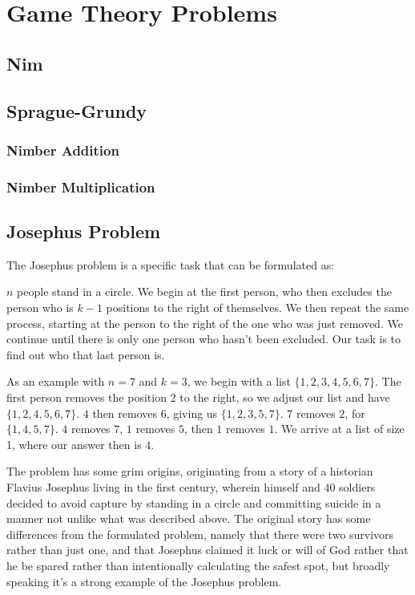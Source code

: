 \section{Game Theory Problems}

\subsection{Nim}

\subsection{Sprague-Grundy}

\subsubsection{Nimber Addition}

\subsubsection{Nimber Multiplication}

\subsection{Josephus Problem}

The Josephus problem is a specific task that can be formulated as:

$n$ people stand in a circle. We begin at the first person, who then excludes the person who is $k-1$ positions to the right of themselves. We then repeat the same process, starting at the person to the right of the one who was just removed. We continue until there is only one person who hasn't been excluded. Our task is to find out who that last person is.

As an example with $n = 7$ and $k = 3$, we begin with a list $\{1, 2, 3, 4, 5, 6, 7\}$. The first person removes the position 2 to the right, so we adjust our list and have $\{1, 2, 4, 5, 6, 7\}$. $4$ then removes $6$, giving us $\{1,2,3,5,7\}$. $7$ removes $2$, for $\{1,4,5,7\}$. $4$ removes $7$, $1$ removes $5$, then $1$ removes $1$. We arrive at a list of size 1, where our answer then is $4$.

The problem has some grim origins, originating from a story of a historian Flavius Josephus living in the first century, wherein himself and 40 soldiers decided to avoid capture by standing in a circle and committing suicide in a manner not unlike what was described above. The original story has some differences from the formulated problem, namely that there were two survivors rather than just one, and that Josephus claimed it luck or will of God rather that he be spared rather than intentionally calculating the safest spot, but broadly speaking it's a strong example of the Josephus problem.

